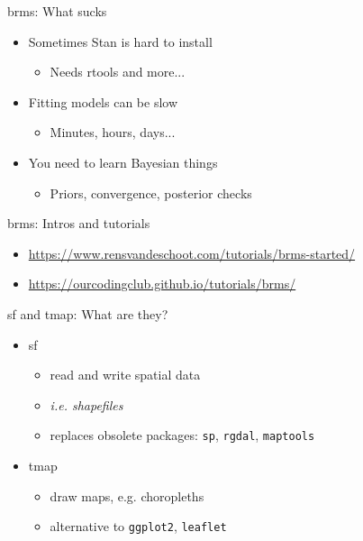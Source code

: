 \documentclass[aspectratio=169,12pt]{beamer} %
\begin{document}
\begin{frame}{brms: What sucks}
	\begin{itemize}
		\item Sometimes Stan is hard to install
		\begin{itemize}
			\item Needs rtools and more...
		\end{itemize}
		\item Fitting models can be slow
		\begin{itemize}
			\item Minutes, hours, days...
		\end{itemize}
		\item You need to learn Bayesian things
		\begin{itemize}
			\item Priors, convergence, posterior checks
		\end{itemize}
	\end{itemize}
\end{frame}

\begin{frame}{brms: Intros and tutorials}
	\begin{itemize}
		\item \scriptsize{\url{https://www.rensvandeschoot.com/tutorials/brms-started/}}
		\item \scriptsize{\url{https://ourcodingclub.github.io/tutorials/brms/}}
	\end{itemize}
\end{frame}


\begin{frame}{sf and tmap: What are they?}
	\begin{itemize}
		\item sf
		\begin{itemize}
			\item read and write spatial data
			\item \emph{i.e. shapefiles}
			\item replaces obsolete packages: \texttt{sp},
				\texttt{rgdal}, \texttt{maptools}
		\end{itemize}
		\item tmap
		\begin{itemize}
			\item draw maps, e.g. choropleths
			\item alternative to \texttt{ggplot2}, \texttt{leaflet}
		\end{itemize}
	\end{itemize}
\end{frame}
\end{document}
